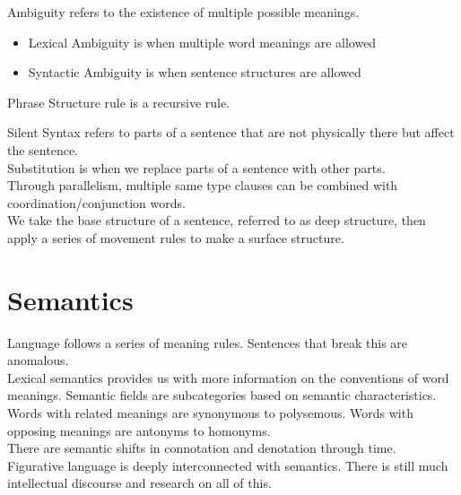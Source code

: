 \documentclass[12pt]{article}
\begin{document}
Ambiguity refers to the existence of multiple possible meanings.
\begin{itemize}
\item Lexical Ambiguity is when multiple word meanings are allowed
\item Syntactic Ambiguity is when sentence structures are allowed
\end{itemize}

Phrase Structure rule is a recursive rule.

Silent Syntax refers to parts of a sentence that are not physically there but affect the sentence. \\

Substitution is when we replace parts of a sentence with other parts. \\

Through parallelism, multiple same type clauses can be combined with coordination/conjunction words. \\

We take the base structure of a sentence, referred to as deep structure, then apply a series of movement rules to make a surface structure.

\section{Semantics}

Language follows a series of meaning rules. Sentences that break this are anomalous. \\

Lexical semantics provides us with more information on the conventions of word meanings. Semantic fields are subcategories based on semantic characteristics. \\

Words with related meanings are synonymous to polysemous. Words with opposing meanings are antonyms to homonyms. \\

There are semantic shifts in connotation and denotation through time. \\

Figurative language is deeply interconnected with semantics. There is still much intellectual discourse and research on all of this.
\end{document}
